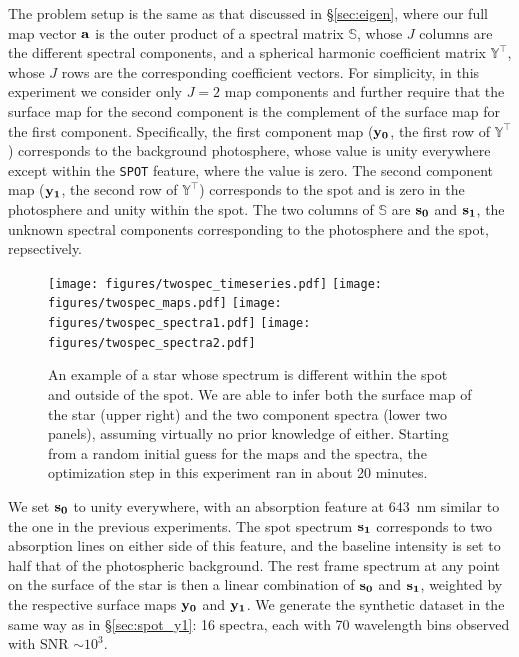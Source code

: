 \documentclass[modern]{aastex631}
\def\timeInferTwoSpec{about 20 minutes}
\begin{document}
The problem setup is the same as that discussed in \S\ref{sec:eigen}, where our full map vector ${\mathbf{a}}$ is the outer product of a spectral matrix $\mathbb{S}$, whose $J$ columns are the different spectral components, and a spherical harmonic coefficient matrix $\mathbb{Y}^\top$, whose $J$ rows are the corresponding coefficient vectors. 
For simplicity, in this experiment we consider only $J = 2$ map components and further require that the surface map for the second component is the complement of the surface map for the first component.
Specifically, the first component map (${\mathbf{y_0}}$, the first row of $\mathbb{Y}^\top$) corresponds to the background photosphere, whose value is unity everywhere except within the \texttt{SPOT} feature, where the value is zero.
The second component map (${\mathbf{y_1}}$, the second row of $\mathbb{Y}^\top$) corresponds to the spot and is zero in the photosphere and unity within the spot.
The two columns of $\mathbb{S}$ are ${\mathbf{s_0}}$ and ${\mathbf{s_1}}$, the unknown spectral components corresponding to the photosphere and the spot, repsectively.
%
\begin{figure}[p!]
    \begin{centering}
        \texttt{[image: figures/twospec\_timeseries.pdf]}
        \texttt{[image: figures/twospec\_maps.pdf]}
        \texttt{[image: figures/twospec\_spectra1.pdf]}
        \texttt{[image: figures/twospec\_spectra2.pdf]}
        \caption{%
            An example of a star whose spectrum is different within the spot and outside of the spot.
            We are able to infer both the surface map of the star (upper right) and the two component spectra (lower two panels), assuming virtually no prior knowledge of either.
            Starting from a random initial guess for the maps and the spectra, the optimization step in this experiment ran in \timeInferTwoSpec.
        }
        \label{fig:twospec}
    \end{centering}
\end{figure}
%
We set ${\mathbf{s_0}}$ to unity everywhere, with an absorption feature at $643$~nm similar to the one in the previous experiments.
The spot spectrum ${\mathbf{s_1}}$ corresponds to two absorption lines on either side of this feature, and the baseline intensity is set to half that of the photospheric background.
%
The rest frame spectrum at any point on the surface of the star is then a linear combination of ${\mathbf{s_0}}$ and ${\mathbf{s_1}}$, weighted by the respective surface maps ${\mathbf{y_0}}$ and ${\mathbf{y_1}}$.
%
We generate the synthetic dataset in the same way as in \S\ref{sec:spot_y1}: 16 spectra, each with 70 wavelength bins observed with SNR $\sim 10^{3}$.
\end{document}

